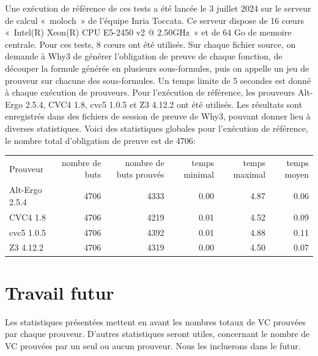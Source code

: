 \documentclass[a4paper,11pt]{article}
\begin{document}
Une exécution de référence de ces tests a été lancée le 3 juillet 2024
sur le serveur de calcul «~moloch~» de l'équipe Inria Toccata. Ce
serveur dispose de 16 c{\oe}urs «~Intel(R) Xeon(R) CPU E5-2450 v2 @
2.50GHz~» et de 64 Go de memoire centrale. Pour ces tests, 8 c{\oe}urs
ont été utilisés. Sur chaque fichier source, on demande à Why3 de
générer l'obligation de preuve de chaque fonction, de découper la
formule générée en plusieurs sous-formules, puis on appelle un jeu de
prouveur sur chacune des sous-formules. Un temps limite de 5 secondes est donné à chaque exécution de prouveurs. Pour l'exécution de référence,
les prouveurs Alt-Ergo 2.5.4, CVC4 1.8, cvc5 1.0.5 et Z3 4.12.2 ont
été utilisés. Les résultats sont enregistrés dans des fichiers de
session de preuve de Why3, pouvant donner lieu à diverses
statistiques. Voici des statistiques globales pour l'exécution de
référence, le nombre total d'obligation de preuve est de 4706:
\begin{center}
  \begin{tabular}{|l|r|r|r|r|r|}
    \hline
  \rowcolor{gray!50} Prouveur
  & \multicolumn{1}{p{0.13\textwidth}|}{nombre de buts}
  & \multicolumn{1}{p{0.13\textwidth}|}{nombre de buts prouvés}
  & \multicolumn{1}{p{0.13\textwidth}|}{temps minimal}
  & \multicolumn{1}{p{0.13\textwidth}|}{temps maximal}
  & \multicolumn{1}{p{0.13\textwidth}|}{temps moyen}
  \\
  Alt-Ergo 2.5.4                &  4706  & 4333   & 0.00  & 4.87  & 0.06 \\
  CVC4 1.8                      &  4706  & 4219   & 0.01  & 4.52  & 0.09 \\
  cvc5 1.0.5                    &  4706  & 4392   & 0.01  & 4.88  & 0.11 \\
  Z3 4.12.2                     &  4706  & 4319   & 0.00  & 4.50  & 0.07 \\
  \hline
\end{tabular}
\end{center}



\section{Travail futur}

Les statistiques présentées mettent en avant les nombres totaux de VC prouvées
par chaque prouveur. D'autres statistiques seront utiles, concernant le nombre
de VC prouvées par un seul ou aucun prouveur. Nous les incluerons dans le futur.
\end{document}
